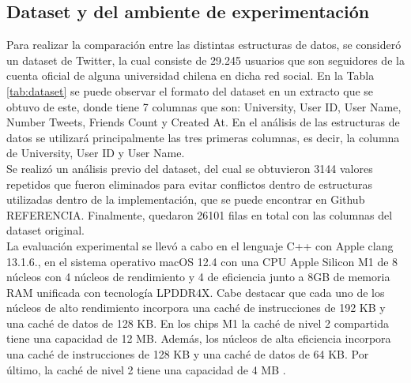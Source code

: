 \begin{multicols}{2}
\section{Dataset y del ambiente de experimentación}
Para realizar la comparación entre las distintas estructuras de datos, se consideró un dataset de Twitter, la cual consiste de 29.245 usuarios que son seguidores de la cuenta oficial de alguna universidad chilena en dicha red social. En la Tabla \ref{tab:dataset} se puede observar el formato del dataset en un extracto que se obtuvo de este, donde tiene 7 columnas que son: University, User ID, User Name, Number Tweets, Friends Count y Created At. En el análisis de las estructuras de datos se utilizará principalmente las tres primeras columnas, es decir, la columna de University, User ID y User Name.\\
Se realizó un análisis previo del dataset, del cual se obtuvieron 3144 valores repetidos que fueron eliminados para evitar conflictos dentro de estructuras utilizadas dentro de la implementación, que se puede encontrar en Github REFERENCIA. Finalmente, quedaron 26101 filas en total con las columnas del dataset original.\\
\indent La evaluación experimental se llevó a cabo en el lenguaje C++ con Apple clang 13.1.6., en el sistema operativo macOS 12.4 con una CPU Apple Silicon M1 de 8 núcleos con 4 núcleos de rendimiento y 4 de eficiencia junto a 8GB de memoria RAM unificada con tecnología LPDDR4X. Cabe destacar que cada uno de los núcleos de alto rendimiento incorpora una caché de instrucciones de 192 KB y una caché de datos de 128 KB. En los chips M1 la caché de nivel 2 compartida tiene una capacidad de 12 MB. Además, los núcleos de alta eficiencia incorpora una caché de instrucciones de 128 KB y una caché de datos de 64 KB. Por último, la caché de nivel 2 tiene una capacidad de 4 MB \cite{chipM1}.
\end{multicols}
